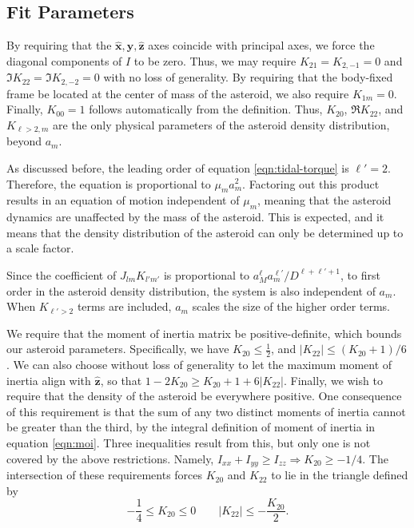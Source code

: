 \documentclass[linenumbers]{aastex631}
\newcommand{\unit}[1]{\hat{\mathbf{#1}}}
\begin{document}
\subsection{Fit Parameters}
By requiring that the $\unit x, \unit y, \unit z$ axes coincide with principal axes, we force the diagonal components of $I$ to be zero. Thus, we may require $K_{21}=K_{2,-1}=0$ and $\Im K_{22}=\Im K_{2,-2}=0$ with no loss of generality. By requiring that the body-fixed frame be located at the center of mass of the asteroid, we also require $K_{1m}=0$. Finally, $K_{00}=1$ follows automatically from the definition. Thus, $K_{20}$, $\Re K_{22}$, and $K_{\ell>2, m}$ are the only physical parameters of the asteroid density distribution, beyond $a_m$.

As discussed before, the leading order of equation \ref{eqn:tidal-torque} is $\ell' = 2$. Therefore, the equation is proportional to $\mu_m a_m^2$. Factoring out this product results in an equation of motion independent of $\mu_m$, meaning that the asteroid dynamics are unaffected by the mass of the asteroid. This is expected, and it means that the density distribution of the asteroid can only be determined up to a scale factor.

Since the coefficient of $J_{lm}K_{l'm'}$ is proportional to $a_M^\ell a_m^{\ell'} / D^{\ell+\ell'+1}$, to first order in the asteroid density distribution, the system is also independent of $a_m$. When $K_{\ell' > 2}$ terms are included, $a_m$ scales the size of the higher order terms.

We require that the moment of inertia matrix be positive-definite, which bounds our asteroid parameters. Specifically, we have $K_{20} \leq \frac{1}{2}$, and $|K_{22}| \leq (K_{20}+1)/6$. We can also choose without loss of generality to let the maximum moment of inertia align with $\unit z$, so that $1-2K_{20}\geq K_{20}+1+6|K_{22}|.$ Finally, we wish to require that the density of the asteroid be everywhere positive. One consequence of this requirement is that the sum of any two distinct moments of inertia cannot be greater than the third, by the integral definition of moment of inertia in equation \ref{eqn:moi}. Three inequalities result from this, but only one is not covered by the above restrictions. Namely, $I_{xx} + I_{yy}\geq I_{zz} \Rightarrow K_{20} \geq -1/4$. The intersection of these requirements forces $K_{20}$ and $K_{22}$ to lie in the triangle defined by
\begin{equation}
-\frac{1}{4} \leq K_{20} \leq 0 \qquad |K_{22}| \leq -\frac{K_{20}}{2}.
\label{eqn:parameter-bounds}
\end{equation}
\end{document}
